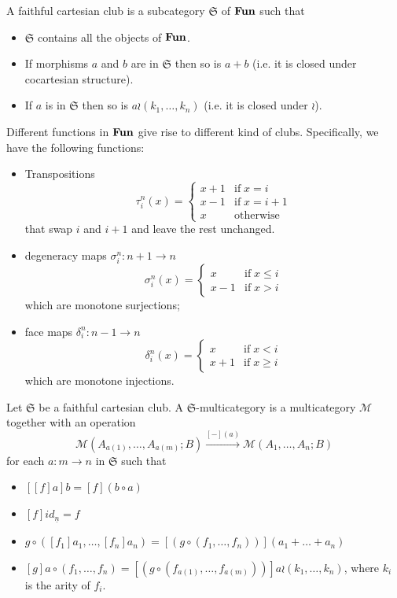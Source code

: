 \documentclass[acmsmall,screen, nonacm, anonymous]{acmart}
\begin{document}
\begin{definition}
  A faithful cartesian club is a subcategory $\mathfrak{S}$ of $\mathbf{Fun}$ such that
  \begin{itemize}
    \item $\mathfrak{S}$ contains all the objects of $\mathbf{Fun}$.
    \item If morphisms $a$ and $b$ are in $\mathfrak{S}$ then so is $a + b$ (i.e. it is closed under cocartesian structure).
    \item If $a$ is in $\mathfrak{S}$ then so is $a \wr (k_1, \ldots, k_n)$ (i.e. it is closed under $\wr$).
  \end{itemize}
\end{definition}

Different functions in $\mathbf{Fun}$ give rise to different kind of clubs.
Specifically, we have the following functions:
\begin{itemize}
  \item Transpositions
  \[
  \tau_{i}^{n}(x) = \begin{cases}
    x + 1 &\text{if}\; x = i\\
    x - 1 &\text{if}\; x = i + 1\\
    x &\text{otherwise}
  \end{cases}
  \]
  that swap $i$ and $i + 1$ and leave the rest unchanged.
  \item degeneracy maps $\sigma_{i}^{n} : n + 1 \to n$
  \[
  \sigma_{i}^{n}(x) = 
  \begin{cases}
    x &\text{if}\; x \leq i\\
    x - 1 &\text{if}\; x > i
  \end{cases}
  \]
  which are monotone surjections;
  \item face maps $\delta_{i}^{n} : n - 1 \to n$
  \[
  \delta_{i}^{n}(x) =
  \begin{cases}
    x &\text{if}\; x < i\\
    x + 1 &\text{if}\; x \geq i
  \end{cases}
  \]
  which are monotone injections.
\end{itemize}

\begin{definition}
Let $\mathfrak{S}$ be a faithful cartesian club. A $\mathfrak{S}$-multicategory is a multicategory $\mathcal{M}$ together with an operation
\[
\mathcal{M}(A_{a(1)}, \ldots, A_{a(m)};B) \xrightarrow{[-](a)} \mathcal{M}(A_1,\ldots, A_n;B)
\]
for each $a : m \to n$ in $\mathfrak{S}$ such that
\begin{itemize}
  \item $[[f]a]b = [f](b \circ a)$
  \item $[f]id_{\underline{n}} = f$
  \item $g \circ ([f_1]a_1, \ldots, [f_n]a_n) = [(g \circ (f_1, \ldots, f_n))](a_1 + \ldots + a_n)$
  \item $[g]a \circ (f_1, \ldots, f_n) = [(g \circ (f_{a(1)}, \ldots, f_{a(m)}))]a \wr (k_1, \ldots, k_n)$, where $k_i$ is the arity of $f_i$.
\end{itemize}
\end{definition}
\end{document}
